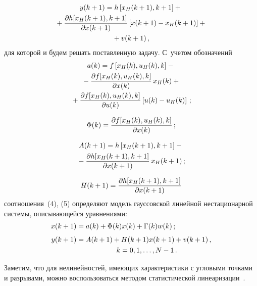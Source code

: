 \begin{multicols}{2}
  \noindent
  \begin{multline}
  y(k+1) =h\left[x_H(k+1),k+1\right]+{}\\
  {}+
  \displaystyle\frac{\displaystyle \partial h[x_H(k+1),k+1]\mathstrut}{\displaystyle \partial x(k+1)\mathstrut}\left[ x(k+1)-
x_H(k+1)\right]+{}\\
{}+v(k+1)\,,\label{e5-c}
  \end{multline}
для которой и будем решать поставленную задачу. С~учетом обозначений
\begin{multline}
a(k)=f\left[ x_H(k),u_H(k),k\right] -{}\\
{}-\displaystyle\frac{\displaystyle \partial f [x_H(k),u_H(k),k]\mathstrut}{\displaystyle \partial
x(k)\mathstrut}\,x_H(k)+{}\\
{}+\displaystyle\frac{\displaystyle \partial f[x_H(k),u_H(k),k]\mathstrut}{\displaystyle \partial u(k)\mathstrut}\left [ u(k)-u_H(k)\right]\,;
\label{e6-c}
\end{multline}

\vspace*{-8pt}

\noindent
\begin{equation}
\Phi(k)=\displaystyle\frac{\displaystyle \partial f[x_H(k),u_H(k),k]\mathstrut}{\displaystyle \partial x(k)\mathstrut}\,;
\label{e7-c}
\end{equation}

\vspace*{-14pt}

\noindent
\begin{multline}
A(k+1)=h\left[ x_H(k+1),k+1\right]-{}\\
{}-\displaystyle\frac{\displaystyle \partial h [x_H(k+1),k+1]\mathstrut}{\displaystyle \partial
x(k+1)\mathstrut}\,x_H(k+1)\,;
\label{e8-c}
\end{multline}

\vspace*{-8pt}

\noindent
\begin{equation}
H(k+1)=\displaystyle\frac{\displaystyle \partial h[x_H(k+1),k+1]\mathstrut}{\displaystyle \partial x(k+1)\mathstrut}
\label{e9-c}
\end{equation}
соотношения~(4), (5) определяют модель гауссовской линейной
нестационарной системы, описывающейся уравнениями:
\begin{align}
x(k+1) &= a(k)+\Phi(k)x(k)+\Gamma(k) w(k)\,;\label{e10-c}\\[4pt]
y(k+1) &=A(k+1) +H(k+1) x(k+1)+v(k+1)\,,\notag\\
&\hspace*{20mm} k=0, 1, \ldots , N-1\,.\label{e11-c}
\end{align}

  Заметим, что для нелинейностей, имеющих характеристики с угловыми
точками и разрывами, можно воспользоваться методом статистической
линеаризации~\cite{12-c, 13-c}.


\end{multicols}
